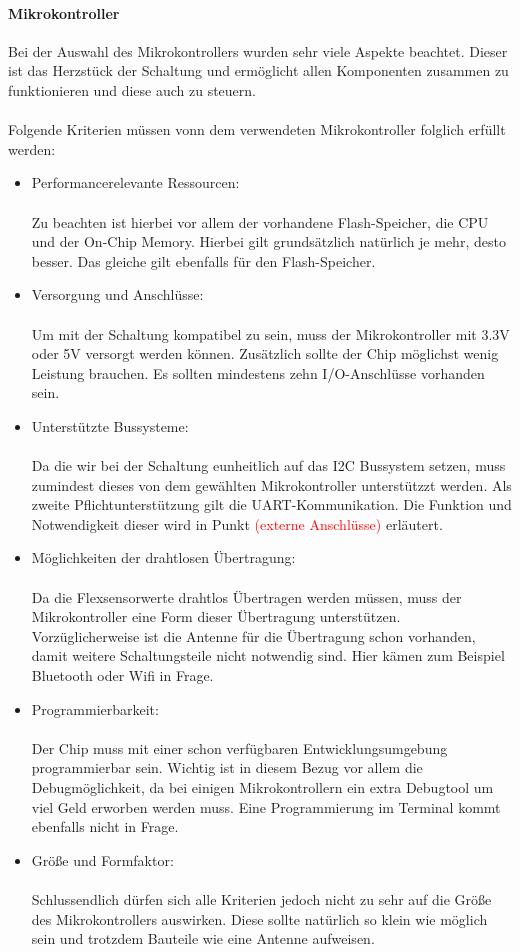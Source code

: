 \documentclass[titlepage,12pt,twoside]{article}
\begin{document}
\paragraph{Mikrokontroller}
\hfill \break
\hfill \break
Bei der Auswahl des Mikrokontrollers wurden sehr viele Aspekte beachtet. Dieser ist das Herzstück der Schaltung und ermöglicht
allen Komponenten zusammen zu funktionieren und diese auch zu steuern. \\
\\
Folgende Kriterien müssen vonn dem verwendeten Mikrokontroller folglich erfüllt werden:
\begin{itemize}
	\item Performancerelevante Ressourcen: \\
		  \\
		  Zu beachten ist hierbei vor allem der vorhandene Flash-Speicher, die CPU und der On-Chip Memory. Hierbei gilt grundsätzlich 
		  natürlich je mehr, desto besser. Das gleiche gilt ebenfalls für den Flash-Speicher.
	\item Versorgung und Anschlüsse: \\
		  \\
		  Um mit der Schaltung kompatibel zu sein, muss der Mikrokontroller mit 3.3V oder 5V versorgt werden können. Zusätzlich
		  sollte der Chip möglichst wenig Leistung brauchen. Es sollten mindestens zehn I/O-Anschlüsse vorhanden sein.
	\item Unterstützte Bussysteme: \\
		  \\
		  Da die wir bei der Schaltung eunheitlich auf das I2C Bussystem setzen, muss zumindest dieses von dem gewählten Mikrokontroller
		  unterstützzt werden. Als zweite Pflichtunterstützung gilt die UART-Kommunikation. Die Funktion und Notwendigkeit dieser
		  wird in Punkt \textcolor{red}{(externe Anschlüsse)} erläutert.
	\item Möglichkeiten der drahtlosen Übertragung: \\
		  \\
		  Da die Flexsensorwerte drahtlos Übertragen werden müssen, muss der Mikrokontroller eine Form dieser Übertragung unterstützen.
		  Vorzüglicherweise ist die Antenne für die Übertragung schon vorhanden, damit weitere Schaltungsteile nicht notwendig sind.
		  Hier kämen zum Beispiel Bluetooth oder Wifi in Frage.
	\item Programmierbarkeit: \\
		  \\
		  Der Chip muss mit einer schon verfügbaren Entwicklungsumgebung programmierbar sein. Wichtig ist in diesem Bezug vor allem
		  die Debugmöglichkeit, da bei einigen Mikrokontrollern ein extra Debugtool um viel Geld erworben werden muss. Eine Programmierung
		  im Terminal kommt ebenfalls nicht in Frage.
	\item Größe und Formfaktor: \\
		  \\
		  Schlussendlich dürfen sich alle Kriterien jedoch nicht zu sehr auf die Größe des Mikrokontrollers auswirken. Diese sollte
		  natürlich so klein wie möglich sein und trotzdem Bauteile wie eine Antenne aufweisen.
\end{itemize}
\end{document}
